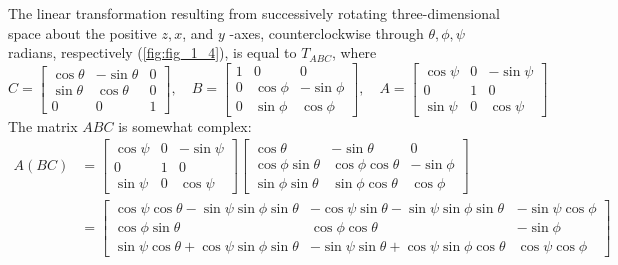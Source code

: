 \documentclass[../main.tex]{subfiles}
\begin{document}
\begin{example} The linear transformation resulting from successively rotating three-dimensional space about the positive $z, x$, and $y$ -axes, counterclockwise through $\theta, \phi, \psi$ radians, respectively (\autoref{fig:fig_1_4}), is equal to $T_{A B C}$, where
$$
C=\left[\begin{array}{lll}
\cos \theta & -\sin \theta & 0 \\
\sin \theta & \cos \theta & 0 \\
0 & 0 & 1
\end{array}\right], \quad B=\left[\begin{array}{lll}
1 & 0 & 0 \\
0 & \cos \phi & -\sin \phi \\
0 & \sin \phi & \cos \phi
\end{array}\right], \quad A=\left[\begin{array}{lll}
\cos \psi & 0 & -\sin \psi \\
0 & 1 & 0 \\
\sin \psi & 0 & \cos \psi
\end{array}\right]
$$
The matrix $A B C$ is somewhat complex:
$$
\begin{aligned}
A(B C) &=\left[\begin{array}{llll}
\cos \psi & 0 & -\sin \psi \\
0 & 1 & 0 \\
\sin \psi & 0 & \cos \psi
\end{array}\right]\left[\begin{array}{lll}
\cos \theta & -\sin \theta & 0 \\
\cos \phi \sin \theta & \cos \phi \cos \theta & -\sin \phi \\
\sin \phi \sin \theta & \sin \phi \cos \theta & \cos \phi
\end{array}\right] \\
&=\left[\begin{array}{lll}
\cos \psi \cos \theta-\sin \psi \sin \phi \sin \theta & -\cos \psi \sin \theta-\sin \psi \sin \phi \sin \theta & -\sin \psi \cos \phi \\
\cos \phi \sin \theta & \cos \phi \cos \theta & -\sin \phi \\
\sin \psi \cos \theta+\cos \psi \sin \phi \sin \theta & -\sin \psi \sin \theta+\cos \psi \sin \phi \cos \theta & \cos \psi \cos \phi
\end{array}\right]
\end{aligned}
$$
\end{example}
\end{document}
